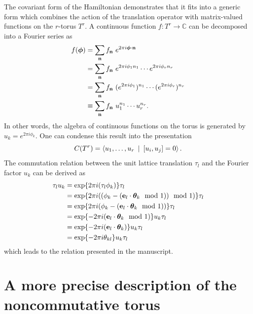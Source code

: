 \documentclass[
    10pt,
    aps,
    prb,
    twocolumn,
    floatfix,
    superscriptaddress,
]{revtex4-2}
\begin{document}
The covariant form of the Hamiltonian demonstrates that it fits into a generic form which combines the action of the translation operator with matrix-valued functions on the $r$-torus $T^r$. 
A continuous function $f\colon T^r \to \mathbb{C}$ can be decomposed into a Fourier series as
\begin{align}
	f( \boldsymbol{\phi} ) & = \sum_{\vec{n} }  f_{\vec{n} }~ e^{2 \pi i \boldsymbol{\phi} \cdot \vec{n} }
	\notag \\
	& = \sum_{\vec{n} }  f_{\vec{n} }~ e^{2 \pi i \phi_1 n_1 } \cdots e^{2 \pi i \phi_r n_r }
	\notag \\
	& = \sum_{\vec{n} }  f_{\vec{n} } ~( e^{2 \pi i \phi_1  } )^{n_1} \cdots ( e^{2 \pi i \phi_r  } )^{n_r} 
	\notag \\
	& \equiv \sum_{\vec{n} }  f_{\vec{n} } ~u_1^{n_1} \cdots u_r^{n_r} .
\end{align}
In other words, the algebra of continuous functions on the torus is generated by $u_k = e^{2 \pi i \phi_k  }$.
One can condense this result into the presentation 
\begin{equation}
	C(T^r) = \Braket{ u_1, \ldots, u_r ~|~ [u_i, u_j] = 0} .
\end{equation}
The commutation relation between the unit lattice translation $\tau_l$ and the Fourier factor $u_k$ can be derived as
\begin{align}
	\tau_l u_k &=
	\exp\lbrace 
	2 \pi i  (\tau_l \phi_k )
	\rbrace \tau_l
	\\ \notag 
	&=
	\exp\lbrace 
	2 \pi  i ( ( \phi_k - ( \vec{e}_l \cdot \boldsymbol{\theta}_k \mod 1) ) \mod 1 )
	\rbrace \tau_l
	\\ \notag 
	&=
	\exp\lbrace 
	2 \pi  i  ( \phi_k - ( \vec{e}_l \cdot \boldsymbol{\theta}_k \mod 1))
	\rbrace \tau_l
	\\ \notag  &= 
	\exp\lbrace 
	-2 \pi  i ( \vec{e}_l \cdot \boldsymbol{\theta}_k \mod 1)
	\rbrace u_k \tau_l
	\\ \notag  &= 
	\exp\lbrace 
	-2 \pi  i  (\vec{e}_l \cdot \boldsymbol{\theta}_k )
	\rbrace u_k \tau_l
	\\ \notag  &= 
	\exp\lbrace 
	-2 \pi  i  \theta_{kl} 
	\rbrace u_k \tau_l 
\end{align}
which leads to the relation presented in the manuscript.




\section{A more precise description of the noncommutative torus}
\label{app:operator_algebra}
\end{document}
